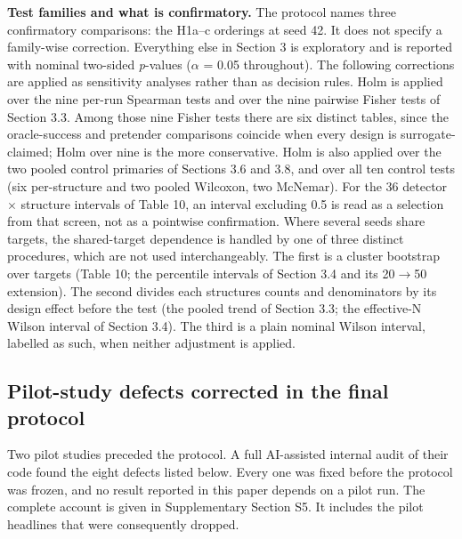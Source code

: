 \documentclass[11pt,a4paper]{article}
\begin{document}
\textbf{Test families and what is confirmatory.} The protocol names three confirmatory
comparisons: the H1a--c orderings at seed 42. It does not specify a family-wise
correction. Everything else in Section 3 is exploratory and is reported with nominal
two-sided \emph{p}-values (\ensuremath{\alpha} = 0.05 throughout). The following corrections are applied as
sensitivity analyses rather than as decision rules. Holm is applied over the nine
per-run Spearman tests and over the nine pairwise Fisher tests of Section 3.3. Among
those nine Fisher tests there are six distinct tables, since the oracle-success and
pretender comparisons coincide when every design is surrogate-claimed; Holm over nine
is the more conservative. Holm is also applied over the two pooled control primaries of
Sections 3.6 and 3.8, and over all ten control tests (six per-structure and two pooled
Wilcoxon, two McNemar). For the 36 detector \ensuremath{\times} structure intervals of Table 10, an
interval excluding 0.5 is read as a selection from that screen, not as a pointwise
confirmation. Where several seeds share targets, the shared-target dependence is
handled by one of three distinct procedures, which are not used interchangeably. The
first is a cluster bootstrap over targets (Table 10; the percentile intervals of
Section 3.4 and its 20\ensuremath{\rightarrow}50 extension). The second divides each structure\textquotesingle s counts and
denominators by its design effect before the test (the pooled trend of Section
3.3; the effective-N Wilson interval of Section 3.4). The third is a plain nominal Wilson
interval, labelled as such, when neither adjustment is applied.

\subsection{Pilot-study defects corrected in the final protocol}\label{sec:2.6}

Two pilot studies preceded the protocol. A full AI-assisted internal audit of their code
found the eight defects listed below. Every one was fixed before the protocol was frozen,
and no result reported in this paper depends on a pilot run. The complete account is given
in Supplementary Section S5. It includes the pilot headlines that were consequently
dropped.
\end{document}
